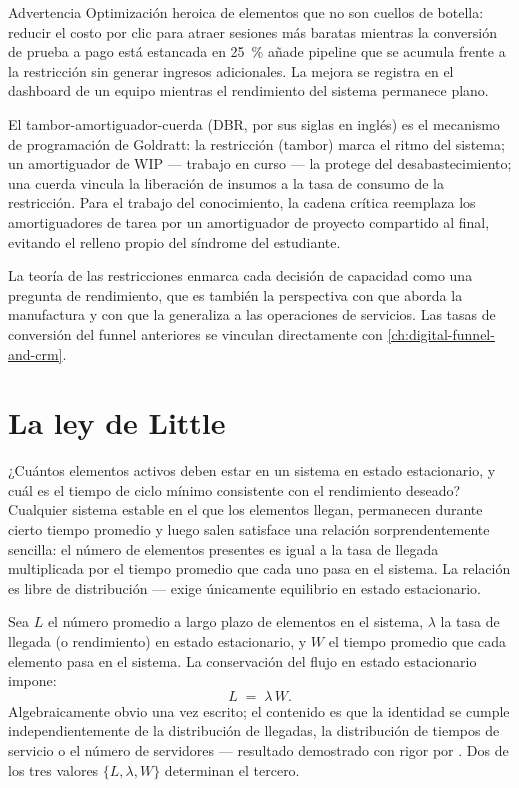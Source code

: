 \begin{admonition}{Advertencia}
Optimización heroica de elementos que no son cuellos de botella: reducir el costo por clic para atraer sesiones más baratas mientras la conversión de prueba a pago está estancada en \qty{25}{\percent} añade pipeline que se acumula frente a la restricción sin generar ingresos adicionales. La mejora se registra en el dashboard de un equipo mientras el rendimiento del sistema permanece plano.
\end{admonition}

El tambor-amortiguador-cuerda (DBR, por sus siglas en inglés) es el mecanismo de programación de Goldratt: la restricción (tambor) marca el ritmo del sistema; un amortiguador de WIP --- trabajo en curso --- la protege del desabastecimiento; una cuerda vincula la liberación de insumos a la tasa de consumo de la restricción. Para el trabajo del conocimiento, la cadena crítica reemplaza los amortiguadores de tarea por un amortiguador de proyecto compartido al final, evitando el relleno propio del síndrome del estudiante.

La teoría de las restricciones enmarca cada decisión de capacidad como una pregunta de rendimiento, que es también la perspectiva con que \textcite{goldratt2014} aborda la manufactura y con que \textcite{cachon2024matching} la generaliza a las operaciones de servicios. Las tasas de conversión del funnel anteriores se vinculan directamente con \cref{ch:digital-funnel-and-crm}.

\section{La ley de Little}\label{sec:littles-law}

¿Cuántos elementos activos deben estar en un sistema en estado estacionario, y cuál es el tiempo de ciclo mínimo consistente con el rendimiento deseado? Cualquier sistema estable en el que los elementos llegan, permanecen durante cierto tiempo promedio y luego salen satisface una relación sorprendentemente sencilla: el número de elementos presentes es igual a la tasa de llegada multiplicada por el tiempo promedio que cada uno pasa en el sistema. La relación es libre de distribución --- exige únicamente equilibrio en estado estacionario.

Sea \(L\) el número promedio a largo plazo de elementos en el sistema, \(\lambda\) la tasa de llegada (o rendimiento) en estado estacionario, y \(W\) el tiempo promedio que cada elemento pasa en el sistema. La conservación del flujo en estado estacionario impone:
\begin{equation}\label{eq:littles-law}
  L \;=\; \lambda \, W.
\end{equation}
Algebraicamente obvio una vez escrito; el contenido es que la identidad se cumple independientemente de la distribución de llegadas, la distribución de tiempos de servicio o el número de servidores --- resultado demostrado con rigor por \textcite{cachon2024matching}. Dos de los tres valores \(\{L, \lambda, W\}\) determinan el tercero.

